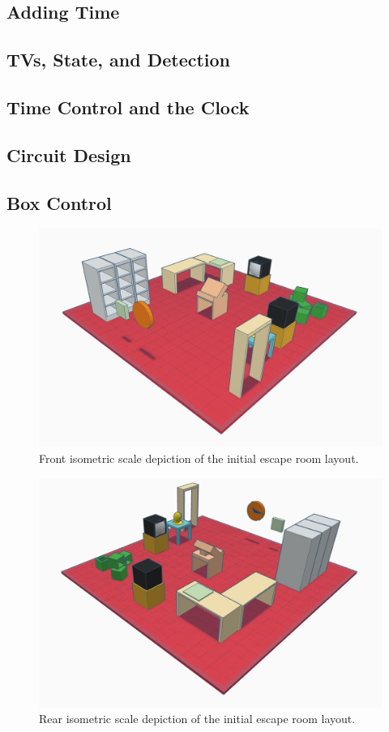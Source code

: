\documentclass[conference]{IEEEtran}
\begin{document}
\subsection{Adding Time}

\subsection{TVs, State, and Detection}

\subsection{Time Control and the Clock}

\subsection{Circuit Design}

\subsection{Box Control}

\begin{figure}[ht]
    \centering
    \includegraphics[width=0.90\columnwidth]{Images/EscapeRoomIsoFront.jpg}
    \caption{Front isometric scale depiction of the initial escape room layout.}
\end{figure}

\begin{figure}[ht]
    \centering
    \includegraphics[width=0.75\columnwidth]{Images/EscapeRoomIsoRear.jpg}
    \caption{Rear isometric scale depiction of the initial escape room layout.}
\end{figure}
\end{document}
